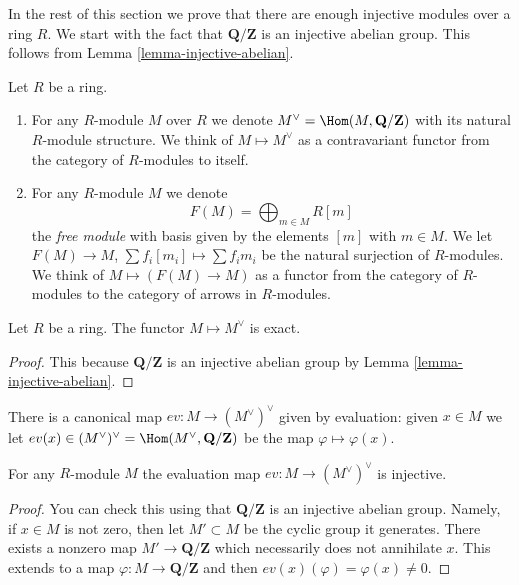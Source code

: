 \noindent
In the rest of this section we prove that there are enough injective
modules over a ring $R$. We start with the fact that $\mathbf{Q}/\mathbf{Z}$
is an injective abelian group. This follows from
Lemma \ref{lemma-injective-abelian}.

\begin{definition}
\label{definition-simple-functors}
Let $R$ be a ring.
\begin{enumerate}
\item For any $R$-module $M$ over $R$ we denote
$M^\vee = \Hom(M, \mathbf{Q}/\mathbf{Z})$
with its natural $R$-module structure. We think
of {\it $M \mapsto M^\vee$} as a contravariant functor
from the category of $R$-modules to itself.
\item For any $R$-module $M$ we denote
$$
F(M) = \bigoplus\nolimits_{m \in M} R[m]
$$
the {\it free module} with basis given by the elements $[m]$ with
$m \in M$. We let $F(M)\to M$, $\sum f_i [m_i] \mapsto \sum f_i m_i$
be the natural surjection of $R$-modules.
We think of $M \mapsto (F(M) \to M)$ as a functor from
the category of $R$-modules to the category of
arrows in $R$-modules.
\end{enumerate}
\end{definition}

\begin{lemma}
\label{lemma-vee-exact}
Let $R$ be a ring.
The functor $M \mapsto M^\vee$ is exact.
\end{lemma}

\begin{proof}
This because $\mathbf{Q}/\mathbf{Z}$
is an injective abelian group by Lemma \ref{lemma-injective-abelian}.
\end{proof}

\noindent
There is a canonical map $ev : M \to (M^\vee)^\vee$
given by evaluation: given $x \in M$ we let
$ev(x) \in (M^\vee)^\vee = \Hom(M^\vee, \mathbf{Q}/\mathbf{Z})$
be the map $\varphi \mapsto \varphi(x)$.

\begin{lemma}
\label{lemma-ev-injective}
For any $R$-module $M$ the evaluation map
$ev : M \to (M^\vee)^\vee$ is injective.
\end{lemma}

\begin{proof}
You can check this using that $\mathbf{Q}/\mathbf{Z}$ is an injective
abelian group. Namely, if $x \in M$ is not zero, then let
$M' \subset M$ be the cyclic group it generates. There exists
a nonzero map $M' \to \mathbf{Q}/\mathbf{Z}$ which necessarily does
not annihilate $x$. This extends to
a map $\varphi : M \to \mathbf{Q}/\mathbf{Z}$
and then $ev(x)(\varphi) = \varphi(x) \not = 0$.
\end{proof}


